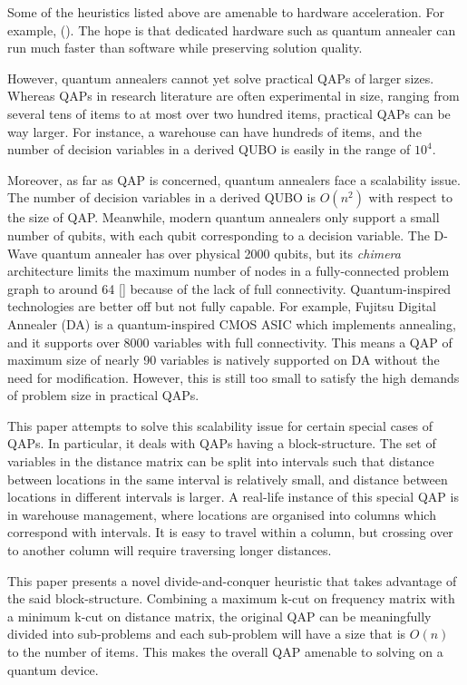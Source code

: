 \documentclass[conference]{IEEEtran}
\begin{document}
Some of the heuristics listed above are amenable to hardware acceleration. For example, (). The hope is that dedicated hardware such as quantum annealer can run much faster than software while preserving solution quality.

However, quantum annealers cannot yet solve practical QAPs of larger sizes. Whereas QAPs in research literature are often experimental in size, ranging from several tens of items to at most over two hundred items, practical QAPs can be way larger. For instance, a warehouse can have hundreds of items, and the number of decision variables in a derived QUBO is easily in the range of $10^4$.

Moreover, as far as QAP is concerned, quantum annealers face a scalability issue. The number of decision variables in a derived QUBO is $O(n^2)$ with respect to the size of QAP. Meanwhile, modern quantum annealers only support a small number of qubits, with each qubit corresponding to a decision variable. The D-Wave quantum annealer has over physical 2000 qubits, but its \textit{chimera} architecture limits the maximum number of nodes in a fully-connected problem graph to around 64 [] because of the lack of full connectivity. Quantum-inspired technologies are better off but not fully capable. For example, Fujitsu Digital Annealer (DA) is a quantum-inspired CMOS ASIC which implements annealing, and it supports over 8000 variables with full connectivity. This means a QAP of maximum size of nearly 90 variables is natively supported on DA without the need for modification. However, this is still too small to satisfy the high demands of problem size in practical QAPs.

This paper attempts to solve this scalability issue for certain special cases of QAPs. In particular, it deals with QAPs having a block-structure. The set of variables in the distance matrix can be split into intervals such that distance between locations in the same interval is relatively small, and distance between locations in different intervals is larger. A real-life instance of this special QAP is in warehouse management, where locations are organised into columns which correspond with intervals. It is easy to travel within a column, but crossing over to another column will require traversing longer distances.

This paper presents a novel divide-and-conquer heuristic that takes advantage of the said block-structure. Combining a maximum k-cut on frequency matrix with a minimum k-cut on distance matrix, the original QAP can be meaningfully divided into sub-problems and each sub-problem will have a size that is $O(n)$ to the number of items. This makes the overall QAP amenable to solving on a quantum device.
\end{document}
